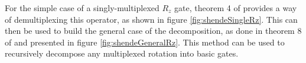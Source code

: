 \documentclass[../../../dissertation.tex]{subfiles}
\begin{document}
For the simple case of a singly-multiplexed $R_z$ gate, theorem 4 of
\cite{shende06} provides a way of demultiplexing this operator, as shown in
figure \ref{fig:shendeSingleRz}.
This can then be used to build the general case of the decomposition, as done in theorem
8 of \cite{shende06} and presented in figure \ref{fig:shendeGeneralRz}.
This method can be used to recursively decompose any multiplexed rotation into basic gates.
\end{document}
